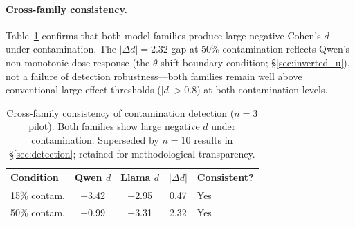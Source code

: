 \begin{table}[t]
\centering
\caption{Cohen's $d$ with 95\% confidence intervals for contaminated conditions relative to clean baselines ($n{=}3$ seeds). Analytic CIs use $t_{0.025, \text{df}=2}$; bootstrap CIs use 10{,}000 resamples. These $n{=}3$ pilot results are superseded by the $n{=}10$ analysis in \S\ref{sec:detection}; retained for methodological transparency.}
\label{tab:cohens_d_ci}
\footnotesize
{}
\end{table}

\paragraph{Cross-family consistency.}
Table~\ref{tab:cross_family} confirms that both model families produce large negative Cohen's $d$ under contamination.
The $|\Delta d| = 2.32$ gap at 50\% contamination reflects Qwen's non-monotonic dose-response (the $\theta$-shift boundary condition; \S\ref{sec:inverted_u}), not a failure of detection robustness---both families remain well above conventional large-effect thresholds ($|d| > 0.8$) at both contamination levels.

\begin{table}[t]
\centering
\caption{Cross-family consistency of contamination detection ($n{=}3$ pilot). Both families show large negative $d$ under contamination. Superseded by $n{=}10$ results in \S\ref{sec:detection}; retained for methodological transparency.}
\label{tab:cross_family}
\small
\begin{tabular}{@{}lcccl@{}}
\toprule
Condition & Qwen $d$ & Llama $d$ & $|\Delta d|$ & Consistent? \\
\midrule
15\% contam. & $-$3.42 & $-$2.95 & 0.47 & Yes \\
50\% contam. & $-$0.99 & $-$3.31 & 2.32 & Yes \\
\bottomrule
\end{tabular}
\end{table}


